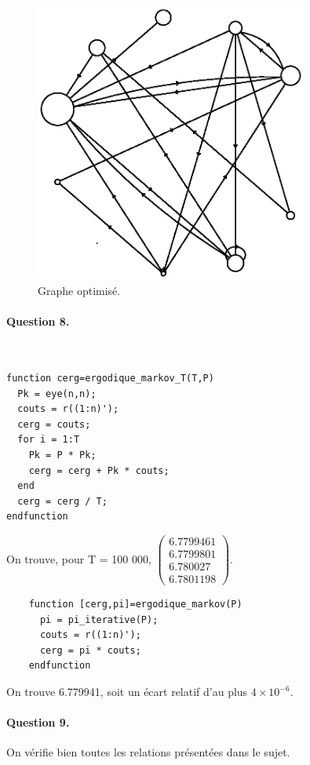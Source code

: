 \documentclass[12pt,a4paper]{article}
\begin{document}
\begin{figure}[H]
    \centering
    \includegraphics[width=0.8\textwidth]{q7.eps}
    \caption{Graphe optimisé.}
\end{figure}

\paragraph*{Question 8.}
~
\begin{lstlisting}
function cerg=ergodique_markov_T(T,P)
  Pk = eye(n,n);
  couts = r((1:n)');
  cerg = couts;
  for i = 1:T
    Pk = P * Pk;
    cerg = cerg + Pk * couts;
  end
  cerg = cerg / T;
endfunction
\end{lstlisting}

On trouve, pour T = 100 000, $\begin{pmatrix} 6.7799461 \\ 6.7799801 \\ 6.780027 \\ 6.7801198 \end{pmatrix}$.

\begin{lstlisting}
    function [cerg,pi]=ergodique_markov(P)
      pi = pi_iterative(P);
      couts = r((1:n)');
      cerg = pi * couts;
    endfunction
\end{lstlisting}

On trouve 6.779941, soit un écart relatif d'au plus $4 \times 10^{-6}$.

\paragraph*{Question 9.}
On vérifie bien toutes les relations présentées dans le sujet.
\end{document}
